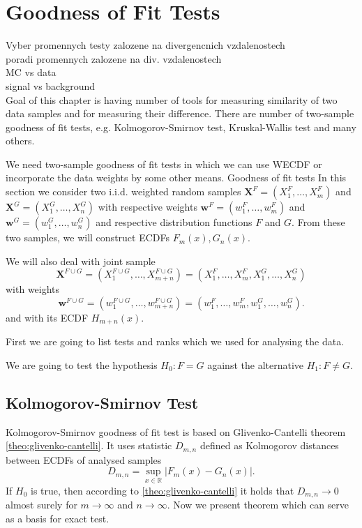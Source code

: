\chapter{Goodness of Fit Tests}
\label{ch:GoF}

Vyber promennych \newline
testy zalozene na divergencnich vzdalenostech \\
poradi promennych zalozene na div. vzdalenostech\\
 MC vs data\\
signal vs background\\

Goal of this chapter is having number of tools for measuring similarity of two data samples and for measuring their difference. There are number of two-sample goodness of fit  tests, e.g. Kolmogorov-Smirnov test, Kruskal-Wallis test and many others. 

We need two-sample goodness of fit  tests in which we can use WECDF or incorporate the data weights by some other means.
Goodness of fit tests 
In this section we consider two i.i.d. weighted random samples $\mathbf{X}^F = (X^F_1,\ldots, X^F_m)$ and $\mathbf{X}^G = (X^G_1, \ldots, X^G_n)$ with respective weights $\mathbf{w}^F = (w^F_1,\ldots, w^F_m)$ and $\mathbf{w}^G = (w^G_1,\ldots, w^G_n)$ and respective distribution functions $F$ and $G$. From these two samples, we will construct ECDFs $F_m(x), G_n(x).$ 

We will also deal with joint sample 
\begin{equation}
\mathbf{X}^{F\cup G} = (X^{F\cup G}_1, \ldots, X^{F\cup G}_{m+n}) = (X^{F}_1, \ldots, X^{F}_{m},X^G_1,\ldots, X^G_n)
\end{equation}
with weights 
\begin{equation}
\mathbf{w}^{F\cup G} = (w^{F\cup G}_1,\ldots, w^{F\cup G}_{m+n}) = (w^{F}_1,\ldots, w^{F}_{m},w^{G}_1,\ldots, w^{G}_{n}).
\end{equation}
and with its ECDF $H_{m+n}(x)$.

First we are going to list  tests and ranks which we used for analysing the data.

We are going to test the hypothesis $H_0: F = G$ against the alternative $H_1: F \neq G$. 
\section{Kolmogorov-Smirnov Test}
Kolmogorov-Smirnov goodness of fit test is based on Glivenko-Cantelli theorem \ref{theo:glivenko-cantelli}. It uses statistic $D_{m,n}$ defined as Kolmogorov distances between ECDFs of analysed samples
\begin{equation}
D_{m,n} = \sup_{x \in \mathbb{R}} |F_m(x) - G_n(x)|.
\end{equation}
If $H_0$ is true, then according to \ref{theo:glivenko-cantelli} it holds that $D_{m,n} \rightarrow 0$ almost surely for $m \rightarrow \infty$ and $n \rightarrow \infty$. Now we present theorem which can serve as a basis for exact test.

